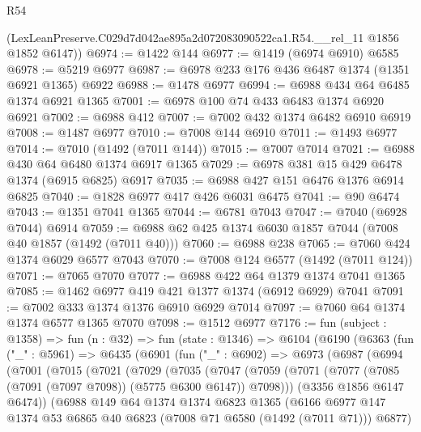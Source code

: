 \begin{lexlean}{R54}
\begin{coremodule}
      (LexLeanPreserve.C029d7d042ae895a2d072083090522ca1.R54.__rel_11 @1856 @1852 @6147))
@6974 := @1422 @144
@6977 := @1419 (@6974 @6910) @6585
@6978 := @5219 @6977
@6987 := @6978 @233 @176 @436 @6487 @1374 (@1351 @6921 @1365) @6922
@6988 := @1478 @6977
@6994 := @6988 @434 @64 @6485 @1374 @6921 @1365
@7001 := @6978 @100 @74 @433 @6483 @1374 @6920 @6921
@7002 := @6988 @412
@7007 := @7002 @432 @1374 @6482 @6910 @6919
@7008 := @1487 @6977
@7010 := @7008 @144 @6910
@7011 := @1493 @6977
@7014 := @7010 (@1492 (@7011 @144))
@7015 := @7007 @7014
@7021 := @6988 @430 @64 @6480 @1374 @6917 @1365
@7029 := @6978 @381 @15 @429 @6478 @1374 (@6915 @6825) @6917
@7035 := @6988 @427 @151 @6476 @1376 @6914 @6825
@7040 := @1828 @6977 @417 @426 @6031 @6475
@7041 := @90 @6474
@7043 := @1351 @7041 @1365
@7044 := @6781 @7043
@7047 := @7040 (@6928 @7044) @6914
@7059 := @6988 @62 @425 @1374 @6030 @1857 @7044 (@7008 @40 @1857 (@1492 (@7011 @40)))
@7060 := @6988 @238
@7065 := @7060 @424 @1374 @6029 @6577 @7043
@7070 := @7008 @124 @6577 (@1492 (@7011 @124))
@7071 := @7065 @7070
@7077 := @6988 @422 @64 @1379 @1374 @7041 @1365
@7085 := @1462 @6977 @419 @421 @1377 @1374 (@6912 @6929) @7041
@7091 := @7002 @333 @1374 @1376 @6910 @6929 @7014
@7097 := @7060 @64 @1374 @1374 @6577 @1365 @7070
@7098 := @1512 @6977
@7176 := fun (subject : @1358) =>
  fun (n : @32) =>
  fun (state : @1346) =>
  @6104
    (@6190
      (@6363
        (fun ("_" : @5961) =>
        @6435
          (@6901
            (fun ("_" : @6902) =>
            @6973
              (@6987
                (@6994
                  (@7001
                    (@7015
                      (@7021
                        (@7029
                          (@7035
                            (@7047
                              (@7059
                                (@7071
                                  (@7077 (@7085 (@7091 (@7097 @7098)) (@5775 @6300 @6147)) @7098)))
                              (@3356 @1856 @6147 @6474))
                            (@6988
                              @149
                              @64
                              @1374
                              @1374
                              @6823
                              @1365
                              (@6166
                                @6977
                                @147
                                @1374
                                @53
                                @6865
                                @40
                                @6823
                                (@7008 @71 @6580 (@1492 (@7011 @71)))
                                @6877)

\end{coremodule}
\end{lexlean}
